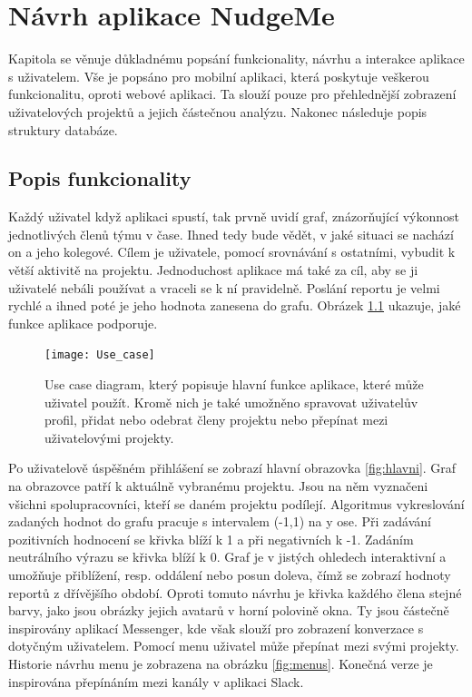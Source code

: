 \chapter{Návrh aplikace NudgeMe}

Kapitola se věnuje důkladnému popsání funkcionality, návrhu a interakce aplikace s uživatelem. Vše je popsáno pro mobilní aplikaci, která poskytuje veškerou funkcionalitu, oproti webové aplikaci. Ta slouží pouze pro přehlednější zobrazení uživatelových projektů a jejich částečnou analýzu. Nakonec následuje popis struktury databáze.

\section{Popis funkcionality}

Každý uživatel když aplikaci spustí, tak prvně uvidí graf, znázorňující výkonnost jednotlivých členů týmu v čase. Ihned tedy bude vědět, v jaké situaci se nachází on a jeho kolegové. Cílem je uživatele, pomocí srovnávání s ostatními, vybudit k větší aktivitě na projektu. Jednoduchost aplikace má také za cíl, aby se ji uživatelé nebáli používat a vraceli se k ní pravidelně. Poslání reportu je velmi rychlé a ihned poté je jeho hodnota zanesena do grafu. Obrázek \ref{use_case} ukazuje, jaké funkce aplikace podporuje.  

\begin{figure}[H]
\centering
\texttt{[image: Use\_case]}
\caption{Use case diagram, který popisuje hlavní funkce aplikace, které může uživatel použít. Kromě nich je také umožněno spravovat uživatelův profil, přidat nebo odebrat členy projektu nebo přepínat mezi uživatelovými projekty. }
\label{use_case}
\end{figure}
 
Po uživatelově úspěšném přihlášení se zobrazí hlavní obrazovka \ref{fig:hlavni}. Graf na obrazovce patří k aktuálně vybranému projektu. Jsou na něm vyznačeni všichni spolupracovníci, kteří se daném projektu podílejí. Algoritmus vykreslování zadaných hodnot do grafu pracuje s intervalem (-1,1) na y ose. Při zadávání pozitivních hodnocení se křivka blíží k 1 a při negativních k -1. Zadáním neutrálního výrazu se křivka blíží k 0. Graf je v jistých ohledech interaktivní a umožňuje přiblížení, resp. oddálení nebo posun doleva, čímž se zobrazí hodnoty reportů z dřívějšího období. Oproti tomuto návrhu je křivka každého člena stejné barvy, jako jsou obrázky jejich avatarů v horní polovině okna. Ty jsou částečně inspirovány aplikací Messenger, kde však slouží pro zobrazení konverzace s dotyčným uživatelem. Pomocí menu uživatel může přepínat mezi svými projekty. Historie návrhu menu je zobrazena na obrázku \ref{fig:menus}. Konečná verze je inspirována přepínáním mezi kanály v aplikaci Slack. 

